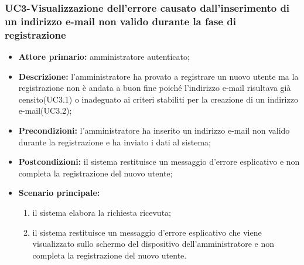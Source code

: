 \subsubsection{UC3-Visualizzazione dell'errore causato dall'inserimento di un indirizzo e-mail non valido durante la fase di registrazione}
\begin{itemize}
	\item \textbf{Attore primario:} amministratore autenticato;

	\item \textbf{Descrizione:} l'amministratore ha provato a registrare un nuovo utente ma la registrazione non è andata a buon fine poiché l'indirizzo e-mail risultava già censito(UC3.1) o inadeguato ai criteri stabiliti per la creazione di un indirizzo e-mail(UC3.2);

	\item \textbf{Precondizioni:} l'amministratore ha inserito un indirizzo e-mail non valido durante la registrazione e ha inviato i dati al sistema;

	\item \textbf{Postcondizioni:} il sistema restituisce un messaggio d'errore esplicativo e non completa la registrazione del nuovo utente;

	\item \textbf{Scenario principale:}
	\begin{enumerate}
   		 \item il sistema elabora la richiesta ricevuta;
   		 \item il sistema restituisce un messaggio d'errore esplicativo che viene visualizzato sullo schermo del dispositivo dell'amministratore e non completa la registrazione del nuovo utente.
	\end{enumerate}
\end{itemize}

